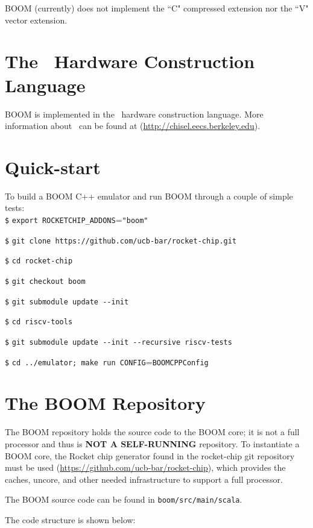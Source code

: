 BOOM (currently) does not implement the ``C" compressed extension nor the ``V" vector extension.

\section{The \Chisel\ Hardware Construction Language}

BOOM is implemented in the \Chisel\ hardware construction language.  More information about \Chisel\ can be found at (\url{http://chisel.eecs.berkeley.edu}). 

\newpage

\section{Quick-start}


To build a BOOM C++ emulator and run BOOM through a couple of simple tests:
\\

\texttt{\$} \verb=export ROCKETCHIP_ADDONS==\verb="boom"=

\texttt{\$} \verb=git clone https://github.com/ucb-bar/rocket-chip.git=

\texttt{\$} \verb=cd rocket-chip=

\texttt{\$} \verb=git checkout boom=

\texttt{\$} \verb=git submodule update --init=

\texttt{\$} \verb=cd riscv-tools=

\texttt{\$} \verb=git submodule update --init --recursive riscv-tests=

\texttt{\$} \verb=cd ../emulator; make run CONFIG==\verb=BOOMCPPConfig=


\section{The BOOM Repository}

The BOOM repository holds the source code to the BOOM core; it is not a full processor and thus is \textbf{NOT A SELF-RUNNING} repository.  To instantiate a BOOM core, the Rocket chip generator found in the rocket-chip git repository must be used (\url{https://github.com/ucb-bar/rocket-chip}), which provides the caches, uncore, and other needed infrastructure to support a full processor.

The BOOM source code can be found in \verb=boom/src/main/scala=.  

The code structure is shown below:

